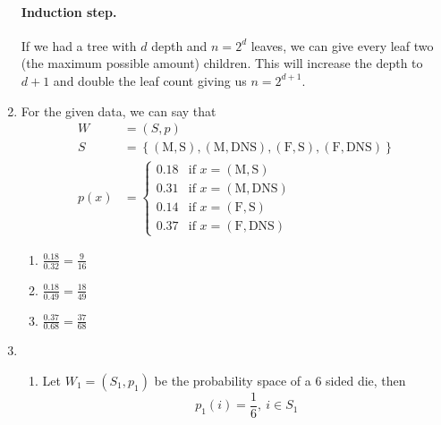 \documentclass{article}
\begin{document}
\begin{enumerate}
{            \paragraph{Induction step.}
            If we had a tree with \(d\) depth and \(n = 2^d\) leaves, we can give every leaf two (the maximum possible amount) children. This will increase the depth to \(d+1\) and double the leaf count giving us \(n = 2^{d+1}\).
        }
        \item { 
            For the given data, we can say that
            \begin{displaymath}
                \begin{aligned}
                    W &= (S,p) \\
                    S &= \left\{{(\text{M},\text{S}), (\text{M},\text{DNS}), (\text{F},\text{S}), (\text{F},\text{DNS})}\right\} \\
                    p(x) &= \begin{cases}
                        0.18 & \text{if } x = (\text{M},\text{S}) \\
                        0.31 & \text{if } x = (\text{M},\text{DNS}) \\
                        0.14 & \text{if } x = (\text{F},\text{S}) \\
                        0.37 & \text{if } x = (\text{F},\text{DNS})
                    \end{cases}
                \end{aligned}
            \end{displaymath}
            \begin{enumerate}[label=(\arabic*)]
                \item \(\frac{0.18}{0.32} = \frac{9}{16}\)
                \item \(\frac{0.18}{0.49} = \frac{18}{49}\)
                \item \(\frac{0.37}{0.68} = \frac{37}{68}\)
            \end{enumerate}
        }
        \newpage
        \item {
            \begin{enumerate}[label=(\arabic*)]
                \item {
                    Let \(W_1 = (S_1, p_1)\) be the probability space of a 6 sided die, then
                    \begin{displaymath}
                        p_1(i) = \frac{1}{6}, \ i \in S_1
                    \end{displaymath}
}
\end{enumerate}}
\end{enumerate}
\end{document}

